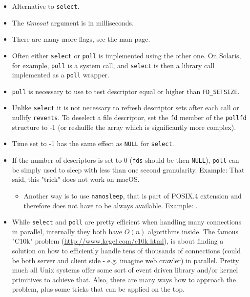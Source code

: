 \begin{itemize}
\item Alternative to \texttt{select}.
\item The \emph{timeout} argument is in milliseconds.
\item There are many more flags, see the man page.
\item Often either \texttt{select} or \texttt{poll} is implemented using the
other one.  On Solaris, for example, \texttt{poll} is a system call, and
\texttt{select} is then a library call implemented as a \texttt{poll} wrapper.
\item \texttt{poll} is necessary to use to test descriptor equal or higher than
\texttt{FD\_SETSIZE}.
\item Unlike \texttt{select} it is not necessary to refresh descriptor sets
after each call or nullify \texttt{revents}. To deselect a file descriptor,
set the \texttt{fd} member of the \texttt{pollfd} structure to -1
(or reshuffle the array which is significantly more complex).
\item Time set to -1 has the same effect as \texttt{NULL} for \texttt{select}.
\item If the number of descriptors is set to 0 (\texttt{fds} should be then
\texttt{NULL}), \texttt{poll} can be simply used to sleep with less than one
second granularity. Example:  
That said, this "trick" does not work on macOS.
\begin{itemize}
\item Another way is to use \texttt{nanosleep}, that is part of POSIX.4
extension and therefore does not have to be always available.
Example: .
\end{itemize}
\item While \texttt{select} and \texttt{poll} are pretty efficient when handling
many connections in parallel, internally they both have $O(n)$ algorithms
inside. The famous "C10k" problem (\url{http://www.kegel.com/c10k.html}),
is about finding a solution on how to efficiently handle tens of thousands of
connections (could be both server and client side - e.g. imagine web crawler) in
parallel. Pretty much all Unix systems offer some sort of event driven library
and/or kernel primitives to achieve that. Also, there are many ways how to
approach the problem, plus some tricks that can be applied on the top.
\end{itemize}

\endinput
